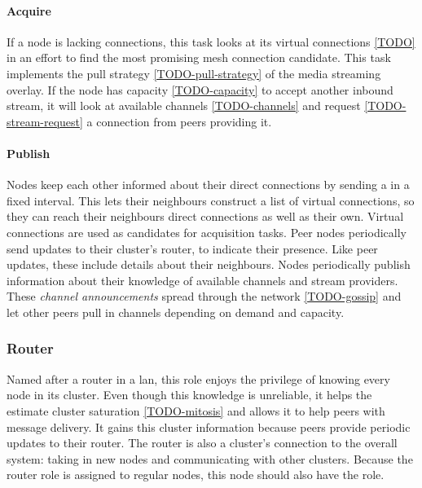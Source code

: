 \paragraph{Acquire}
\begin{itemize}
     If a node is lacking connections, this task looks at its virtual connections \ref{TODO} in an effort to find the most promising mesh connection candidate. 
     This task implements the pull strategy \ref{TODO-pull-strategy} of the media streaming overlay. If the node has capacity \ref{TODO-capacity} to accept another inbound stream, it will look at available channels \ref{TODO-channels} and request \ref{TODO-stream-request} a connection from peers providing it.
\end{itemize}

\paragraph{Publish}\label{par:design-roles-peer-publish}
\begin{itemize}
     Nodes keep each other informed about their direct connections  by sending a \peerUpdate in a fixed interval. This lets their neighbours construct a list of virtual connections, so they can reach their neighbours direct connections as well as their own. Virtual connections are used as candidates for acquisition tasks.
     Peer nodes periodically send updates to their cluster's router, to indicate their presence. Like peer updates, these include details about their neighbours.
    \label{item:peer-publish-channel-announcement} Nodes periodically publish information about their knowledge of available channels and stream providers. These \textit{channel announcements} spread through the network \ref{TODO-gossip} and let other peers pull in channels depending on demand and capacity.
\end{itemize}

\subsubsection{Router}
Named after a router in a \gls{lan}, this role enjoys the privilege of knowing every node in its cluster. Even though this knowledge is unreliable, it helps the \routerRole estimate cluster saturation \ref{TODO-mitosis} and allows it to help peers with message delivery. It gains this cluster information because peers provide periodic updates to their router. The router is also a cluster's connection to the overall system: taking in new nodes and communicating with other clusters. Because the router role is assigned to regular nodes, this node should also have the \peerRole role.

